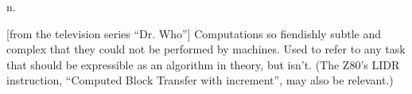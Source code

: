  n.

[from the television series ``Dr. Who''] Computations so fiendishly subtle and
complex that they could not be performed by machines. Used to refer to any task
that should be expressible as an algorithm in theory, but isn't. (The Z80's LIDR
instruction, ``Computed Block Transfer with increment'', may also be relevant.)

